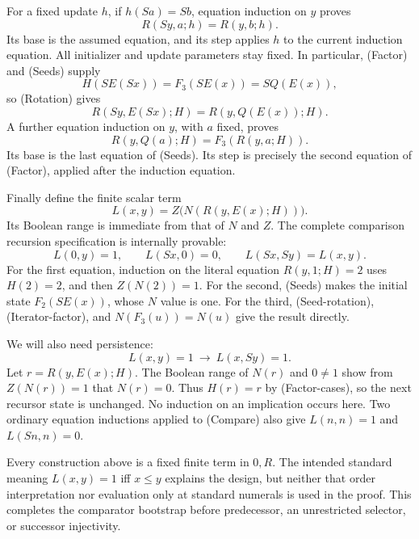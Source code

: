 For a fixed update $h$, if $h(Sa)=Sb$, equation induction on $y$
proves
\[
                         R(Sy,a;h)=R(y,b;h).          \tag{Rotation}
\]
Its base is the assumed equation, and its step applies $h$ to the
current induction equation. All initializer and update parameters stay
fixed. In particular, (Factor) and (Seeds) supply
\[
 H(S E(Sx))=F_3(S E(x))=S Q(E(x)),
\]
so (Rotation) gives
\[
                 R(Sy,E(Sx);H)=R(y,Q(E(x));H).        \tag{Seed-rotation}
\]
A further equation induction on $y$, with $a$ fixed, proves
\[
                  R(y,Q(a);H)=F_3(R(y,a;H)).          \tag{Iterator-factor}
\]
Its base is the last equation of (Seeds). Its step is precisely the
second equation of (Factor), applied after the induction equation.

Finally define the finite scalar term
\[
                    L(x,y)=Z\bigl(N(R(y,E(x);H))\bigr).
\]
Its Boolean range is immediate from that of $N$ and $Z$. The complete
comparison recursion specification is internally provable:
\[
 \boxed{L(0,y)=1,\qquad L(Sx,0)=0,\qquad L(Sx,Sy)=L(x,y).}         \tag{Compare}
\]
For the first equation, induction on the literal equation
$R(y,1;H)=2$ uses $H(2)=2$, and then $Z(N(2))=1$.
For the second, (Seeds) makes the initial state $F_2(S E(x))$, whose
$N$ value is one. For the third, (Seed-rotation), (Iterator-factor), and
$N(F_3(u))=N(u)$ give the result directly.

We will also need persistence:
\[
                          L(x,y)=1\ \longrightarrow\ L(x,Sy)=1. \tag{Persist}
\]
Let $r=R(y,E(x);H)$. The Boolean range of $N(r)$ and $0\ne1$ show
from $Z(N(r))=1$ that $N(r)=0$. Thus $H(r)=r$ by (Factor-cases),
so the next recursor state is unchanged. No induction on an implication
occurs here. Two ordinary equation inductions applied to (Compare)
also give $L(n,n)=1$ and $L(Sn,n)=0$.

Every construction above is a fixed finite term in $0,R$. The intended
standard meaning $L(x,y)=1$ iff $x\le y$ explains the design, but neither
that order interpretation nor evaluation only at standard numerals is
used in the proof. This completes the comparator bootstrap before
predecessor, an unrestricted selector, or successor injectivity.
